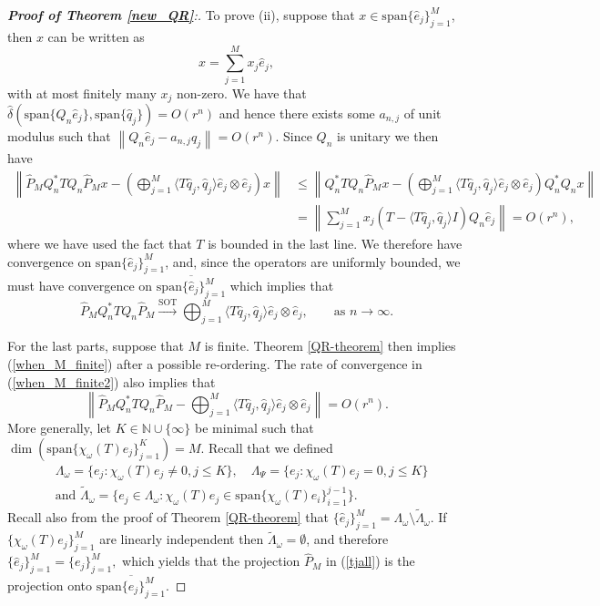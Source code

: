 \documentclass[a4paper,10pt]{article}
\begin{document}
\begin{proof}[\textbf{Proof of Theorem \ref{new_QR}}:]
To prove (ii), suppose that $x\in\mathrm{span}\{\hat e_j\}_{j=1}^M$, then $x$ can be written as 
$$
x=\sum_{j=1}^Mx_j\hat e_j,
$$
with at most finitely many $x_j$ non-zero. We have that $\hat\delta(\mathrm{span}\{Q_n\hat e_j\},\mathrm{span}\{\hat q_j\})= O(r^n)$ and hence there exists some $a_{n,j}$ of unit modulus such that $\left\|Q_n\hat e_j-a_{n,j}\hat q_j\right\|= O(r^n)$. Since $Q_n$ is unitary we then have
\begin{align*}
\left\|\widehat P_{M} Q_n^*TQ_n\widehat P_{M}x-\left(\bigoplus_{j=1}^{M} \langle T\hat q_j,\hat q_j\rangle\hat e_j \otimes \hat e_j \right)x\right\|&\leq\left\|Q_n^*TQ_n\widehat P_{M}x-\left(\bigoplus_{j=1}^{M} \langle T\hat q_j,\hat q_j\rangle\hat e_j \otimes \hat e_j \right)Q_n^*Q_nx\right\|\\
&=\left\|\sum_{j=1}^Mx_j(T-\langle T\hat q_j,\hat q_j\rangle I)Q_n\hat e_j\right\|= O(r^n),
\end{align*}
where we have used the fact that $T$ is bounded in the last line. We therefore have convergence on $\mathrm{span}\{\hat e_j\}_{j=1}^M$, and, since the operators are uniformly bounded, we must have convergence on $\overline{\mathrm{span}\{\hat e_j\}_{j=1}^M}$ which implies that
$$
\widehat P_{M} Q_n^*TQ_n\widehat P_{M}  \stackrel{\text{SOT}}{\longrightarrow} \bigoplus_{j=1}^{M} \langle T\hat q_j,\hat q_j\rangle\hat e_j \otimes \hat e_j ,\qquad \text{as }n \rightarrow \infty.
$$

For the last parts, suppose that $M$ is finite. Theorem \ref{QR-theorem} then implies (\ref{when_M_finite}) after a possible re-ordering. The rate of convergence in (\ref{when_M_finite2}) also implies that
$$
\left\|\widehat P_{M} Q_n^*TQ_n\widehat P_{M}-\bigoplus_{j=1}^{M} \langle T\hat q_j,\hat q_j\rangle\hat e_j \otimes \hat e_j \right\|= O(r^n).
$$
More generally, let $K\in\mathbb{N}\cup\{\infty\}$ be minimal such that $\dim(\mathrm{span}\{\chi_{\omega}(T)e_j\}_{j=1}^K) = M.$ Recall that we defined
\begin{align*}
&\Lambda_{\omega} = \{e_j:\chi_{\omega}(T)e_j \neq 0, j\leq K\}, \quad
\Lambda_{\Psi}= \{e_j:\chi_{\omega}(T)e_j = 0, j \leq K\}\\
&\text{and    } \tilde \Lambda_{\omega} = \{e_j \in
\Lambda_{\omega}:\chi_{\omega}(T)e_j \in
\mathrm{span}\{\chi_{\omega}(T)e_i\}_{i=1}^{j-1}\}.
\end{align*}
Recall also from the proof of Theorem \ref{QR-theorem} that $\{\hat e_j\}_{j=1}^{M} = \Lambda_{\omega} \setminus \tilde \Lambda_{\omega}.$ If $\{\chi_{\omega}(T)e_j\}_{j=1}^M$ are linearly independent then $\tilde \Lambda_{\omega} = \emptyset$, and therefore $\{\hat e_j\}_{j=1}^{M} = \{ e_j\}_{j=1}^{M},$ which yields that the projection $\widehat P_M$ in (\ref{tjall}) is the projection onto $\overline{\mathrm{span}\{e_j\}_{j=1}^M}$.
\end{proof}
\end{document}
